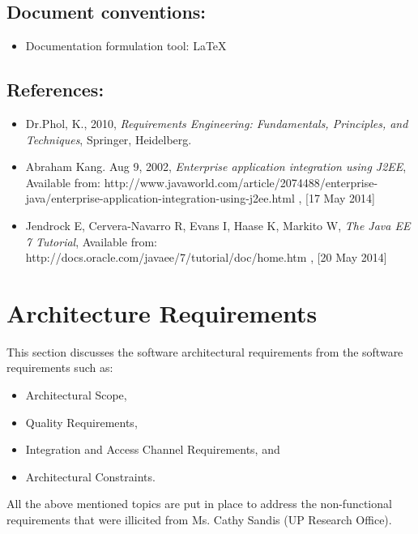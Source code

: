 \documentclass[12pt]{article}
\newcommand{\client}{Ms. Cathy Sandis (UP Research Office)}
\begin{document}
\vspace{0.5in}

\subsection{Document conventions:}
\vspace{0.1in}
\begin{itemize}
\item Documentation formulation tool: LaTeX
\end{itemize}

\vspace{0.2in}

\subsection{References:}
\vspace{0.1in}
\begin{itemize}
\item Dr.Phol, K., 2010, \textit{Requirements Engineering: Fundamentals, Principles, and Techniques}, Springer, Heidelberg.
\item Abraham Kang. Aug 9, 2002, \textit{Enterprise application integration using J2EE}, Available from: http://www.javaworld.com/article/2074488/enterprise-java/enterprise-application-integration-using-j2ee.html , [17 May 2014]
\item Jendrock E, Cervera-Navarro R, Evans I, Haase K, Markito W, \textit{The Java EE 7 Tutorial}, Available from: http://docs.oracle.com/javaee/7/tutorial/doc/home.htm , [20 May 2014]
\end{itemize}	

\vspace{0.5in}

\newpage

\section{Architecture Requirements} 
This section discusses the software architectural requirements from the software requirements such as:
\begin{itemize}
\item Architectural Scope,
\item Quality Requirements,
\item Integration and Access Channel Requirements, and
\item Architectural Constraints.
\end{itemize}
All the above mentioned topics are put in place to address the non-functional requirements that were illicited from \client .
\end{document}
